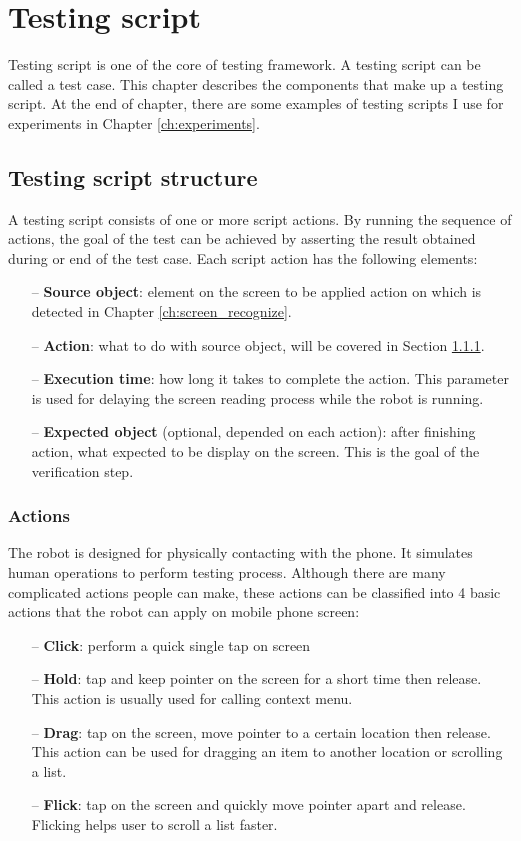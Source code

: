 \chapter{Testing script}
Testing script is one of the core of testing framework.
A testing script can be called a test case.
This chapter describes the components that make up a testing script. At the end of chapter, there are some examples of testing scripts I use for experiments in Chapter \ref{ch:experiments}.

\section{Testing script structure}
\label{sec:script_comp}
A testing script consists of one or more script actions. By running the sequence of actions, the goal of the test can be achieved by asserting the result obtained during or end of the test case. Each script action has the following elements:
    \begin{itemize}
		\item[--] \textbf{Source object}: element on the screen to be applied action on which is detected in Chapter \ref{ch:screen_recognize}.
		\item[--] \textbf{Action}: what to do with source object, will be covered in Section \ref{sec:actions}.
		\item[--] \textbf{Execution time}: how long it takes to complete the action. This parameter is used for delaying the screen reading process while the robot is running.
		\item[--] \textbf{Expected object} (optional, depended on each action): after finishing action, what expected to be display on the screen. This is the goal of the verification step.
	\end{itemize}

\subsection{Actions}
\label{sec:actions}
The robot is designed for physically contacting with the phone. It simulates human operations to perform testing process.
Although there are many complicated actions people can make, these actions can be classified into 4 basic actions that the robot can apply on mobile phone screen:

    \begin{itemize}
		\item[--] \textbf{Click}: perform a quick single tap on screen
		\item[--] \textbf{Hold}: tap and keep pointer on the screen for a short time then release. This action is usually used for calling context menu.
		\item[--] \textbf{Drag}: tap on the screen, move pointer to a certain location then release. This action can be used for dragging an item to another location or scrolling a list.
		\item[--] \textbf{Flick}: tap on the screen and quickly move pointer apart and release. Flicking helps user to scroll a list faster.
	\end{itemize}

